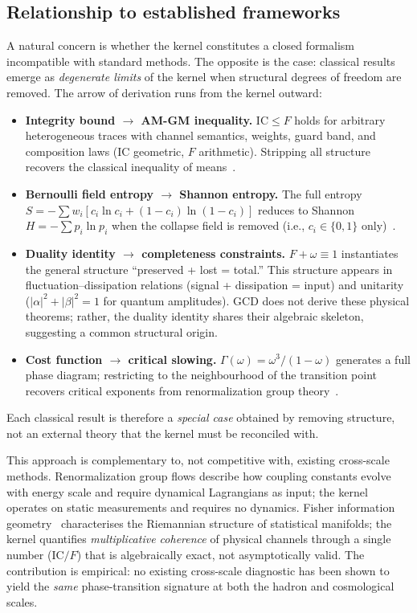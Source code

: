 \documentclass[
  aps,
  prx,
  twocolumn,
  superscriptaddress,
  nofootinbib,
  floatfix
]{revtex4-2}
\newcommand{\IC}{\mathrm{IC}}
\begin{document}
\subsection{Relationship to established frameworks}

A natural concern is whether the kernel constitutes a closed
formalism incompatible with standard methods. The opposite is the
case: classical results emerge as \emph{degenerate limits} of the
kernel when structural degrees of freedom are removed. The arrow
of derivation runs from the kernel outward:

\begin{itemize}[leftmargin=1.5em,itemsep=1pt]
\item \textbf{Integrity bound $\to$ AM-GM inequality.}
  $\IC \leq F$ holds for arbitrary heterogeneous traces with
  channel semantics, weights, guard band, and composition laws
  ($\IC$ geometric, $F$ arithmetic). Stripping all structure
  recovers the classical inequality of
  means~\cite{hardylittlewoodpolya1952}.
\item \textbf{Bernoulli field entropy $\to$ Shannon entropy.}
  The full entropy $S = -\sum w_i[c_i \ln c_i + (1{-}c_i)\ln(1{-}c_i)]$
  reduces to Shannon $H = -\sum p_i \ln p_i$ when the collapse
  field is removed (i.e., $c_i \in \{0,1\}$
  only)~\cite{shannon1948}.
\item \textbf{Duality identity $\to$ completeness constraints.}
  $F + \omega \equiv 1$ instantiates the general structure
  ``preserved + lost = total.'' This structure appears in
  fluctuation--dissipation relations (signal + dissipation = input)
  and unitarity ($|\alpha|^2 + |\beta|^2 = 1$ for quantum
  amplitudes). GCD does not derive these physical theorems;
  rather, the duality identity shares their algebraic skeleton,
  suggesting a common structural origin.
\item \textbf{Cost function $\to$ critical slowing.}
  $\Gamma(\omega) = \omega^3/(1{-}\omega)$ generates a full phase
  diagram; restricting to the neighbourhood of the transition
  point recovers critical exponents from renormalization group
  theory~\cite{gross1973}.
\end{itemize}

\noindent Each classical result is therefore a \emph{special case}
obtained by removing structure, not an external theory that the
kernel must be reconciled with.

This approach is complementary to, not competitive with, existing
cross-scale methods. Renormalization group flows describe how
coupling constants evolve with energy scale and require dynamical
Lagrangians as input; the kernel operates on static measurements
and requires no dynamics. Fisher information
geometry~\cite{amari2016information} characterises the Riemannian
structure of statistical manifolds; the kernel quantifies
\emph{multiplicative coherence} of physical channels through a
single number ($\IC/F$) that is algebraically exact, not
asymptotically valid. The contribution is empirical: no
existing cross-scale diagnostic has been shown to yield the
\emph{same} phase-transition signature at both the hadron and
cosmological scales.
\end{document}
